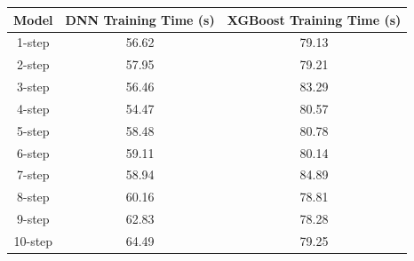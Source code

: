 \documentclass[]{interact}
\theoremstyle{plain}%
\theoremstyle{definition}
\theoremstyle{remark}
\begin{document}
\begin{table}[H]
    {\begin{tabular}{ccc}\toprule
        Model & DNN Training Time (s) & XGBoost Training Time (s) \\\hline
         1-step & 56.62 & 79.13\\
         2-step & 57.95 & 79.21\\
         3-step & 56.46 & 83.29\\
         4-step & 54.47 & 80.57\\
         5-step & 58.48 & 80.78\\
         6-step & 59.11 & 80.14\\
         7-step & 58.94 & 84.89\\
         8-step & 60.16 & 78.81\\
         9-step & 62.83 & 78.28\\
         10-step & 64.49 & 79.25\\
    \bottomrule
    \end{tabular}}
    \label{tab:XGBTrainTime}
\end{table}
\end{document}
